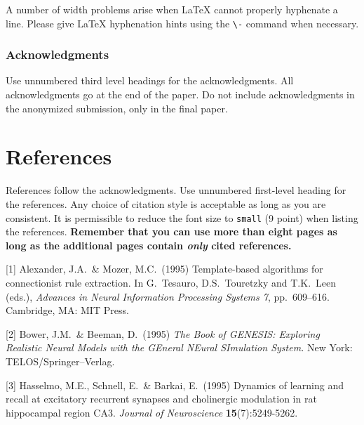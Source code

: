 \documentclass{article}
\begin{document}
A number of width problems arise when \LaTeX{} cannot properly
hyphenate a line. Please give LaTeX hyphenation hints using the
\verb+\-+ command when necessary.

\subsubsection*{Acknowledgments}

Use unnumbered third level headings for the acknowledgments. All
acknowledgments go at the end of the paper. Do not include
acknowledgments in the anonymized submission, only in the final paper.

\section*{References}

References follow the acknowledgments. Use unnumbered first-level
heading for the references. Any choice of citation style is acceptable
as long as you are consistent. It is permissible to reduce the font
size to \verb+small+ (9 point) when listing the references. {\bf
  Remember that you can use more than eight pages as long as the
  additional pages contain \emph{only} cited references.}
\medskip

\small

[1] Alexander, J.A.\ \& Mozer, M.C.\ (1995) Template-based algorithms
for connectionist rule extraction. In G.\ Tesauro, D.S.\ Touretzky and
T.K.\ Leen (eds.), {\it Advances in Neural Information Processing
  Systems 7}, pp.\ 609--616. Cambridge, MA: MIT Press.

[2] Bower, J.M.\ \& Beeman, D.\ (1995) {\it The Book of GENESIS:
  Exploring Realistic Neural Models with the GEneral NEural SImulation
  System.}  New York: TELOS/Springer--Verlag.

[3] Hasselmo, M.E., Schnell, E.\ \& Barkai, E.\ (1995) Dynamics of
learning and recall at excitatory recurrent synapses and cholinergic
modulation in rat hippocampal region CA3. {\it Journal of
  Neuroscience} {\bf 15}(7):5249-5262.
\end{document}
